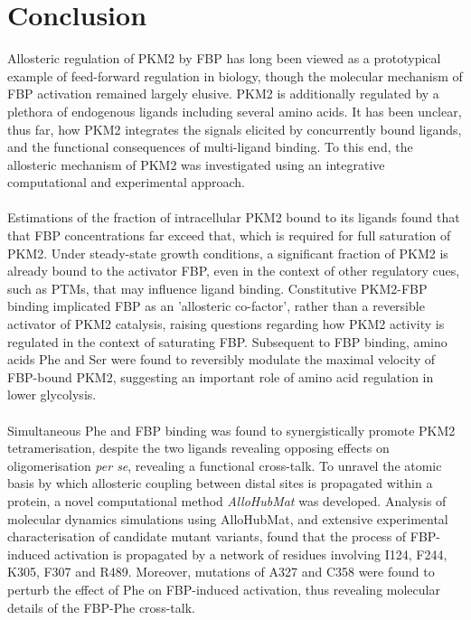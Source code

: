 \clearpage

\section{Conclusion}
Allosteric regulation of PKM2 by FBP has long been viewed as a prototypical example of feed-forward regulation in biology, though the molecular mechanism of FBP activation remained largely elusive. PKM2 is additionally regulated by a plethora of endogenous ligands including several amino acids. It has been unclear, thus far, how PKM2 integrates the signals elicited by concurrently bound ligands, and the functional consequences of multi-ligand binding. To this end, the allosteric mechanism of PKM2 was investigated using an integrative computational and experimental approach. 
%
%
\\\\
%
%
Estimations of the fraction of intracellular PKM2 bound to its ligands found that that FBP concentrations far exceed that, which is required for full saturation of PKM2. Under steady-state growth conditions, a significant fraction of PKM2 is already bound to the activator FBP, even in the context of other regulatory cues, such as PTMs, that may influence ligand binding. Constitutive PKM2-FBP binding implicated FBP as an 'allosteric co-factor', rather than a reversible activator of PKM2 catalysis, raising questions regarding how PKM2 activity is regulated in the context of saturating FBP. Subsequent to FBP binding, amino acids Phe and Ser were found to reversibly modulate the maximal velocity of FBP-bound PKM2, suggesting an important role of amino acid regulation in lower glycolysis.
%
%
\\\\
%
%
Simultaneous Phe and FBP binding was found to synergistically promote PKM2 tetramerisation, despite the two ligands revealing opposing effects on oligomerisation \textit{per se}, revealing a functional cross-talk. To unravel the atomic basis by which allosteric coupling between distal sites is propagated within a protein, a novel computational method \textit{AlloHubMat} was developed. Analysis of molecular dynamics simulations using AlloHubMat, and extensive experimental characterisation of candidate mutant variants, found that the process of FBP-induced activation is propagated by a network of residues involving I124, F244, K305, F307 and R489. Moreover, mutations of A327 and C358 were found to perturb the effect of Phe on FBP-induced activation, thus revealing molecular details of the FBP-Phe cross-talk.
